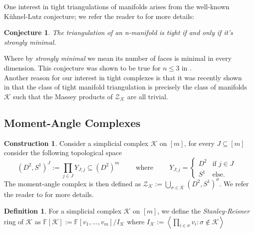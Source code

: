 \documentclass[a4paper]{amsart}
\newtheorem{conj}[thm]{Conjecture}
\theoremstyle{definition}
\newtheorem{defin}[thm]{Definition}
\newtheorem{construction}[thm]{Construction}
\def\K{\mathcal{K}}
\def\ZZ{\mathcal{Z}}
\def\F{\mathbb{F}}
\begin{document}
One interest in tight triangulations of manifolds arises from the well-known Kühnel-Lutz conjecture; we refer the reader to \cite{KunLutz} for more details:

\begin{conj}
    The triangulation of an n-manifold is tight if and only if it's strongly minimal.
\end{conj}
Where by \textit{strongly minimal} we mean its number of faces is minimal in every dimension. This conjecture was shown to be true for $n\leq 3$ in \cite{BagDatSpreer}.\\

Another reason for our interest in tight complexes is that it was recently shown in \cite{iriye2023tightcomplexesgolod} that the class of tight manifold triangulation is precisely the class of manifolds $\K$ such that the Massey products of $\ZZ_\K$ are all trivial.


\subsection{Moment-Angle Complexes}

\begin{construction}
    Consider a simplicial complex $\K$ on $[m]$, for every $J\subseteq [m]$ consider the following topological space
    \[(D^2,S^1)^J:=\prod_{j\in J} Y_{J;j}\subseteq (D^2)^m\hspace{1cm}\text{where}\hspace{1cm} Y_{J;j}=\left\{\begin{array}{cl}
        D^2 & \text{if }j\in J \\
         S^1& \text{else.} 
    \end{array}\right.\]
    The moment-angle complex is then defined as $\ZZ_\K:=\bigcup\limits_{\sigma\in\K}(D^2,S^1)^\sigma$. We refer the reader to \cite[\S4]{ToricTop} for more details.
\end{construction}




\begin{defin}
    For a simplicial complex $\K$ on $[m]$, we define the \textit{Stanley-Reisner} ring of $\K$ as $\F[\K]:=\F[v_1,\ldots, v_m]/I_\K$ where $I_\K:=\left\langle{\prod\limits_{i\in \sigma}v_i:\sigma\notin\K}\right\rangle$
\end{defin}
\end{document}
